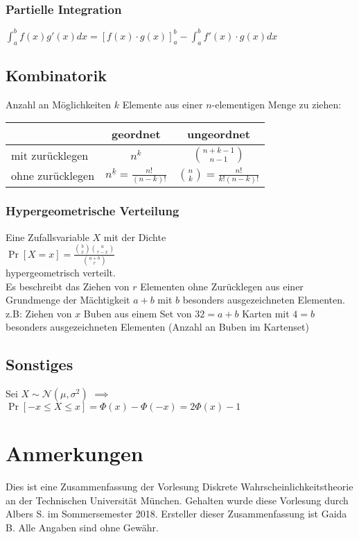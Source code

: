 \documentclass[a4paper,9pt]{extarticle}
\newcommand{\intab}[1] {\int_{a}^{b} #1 dx}
\begin{document}
\subsubsection*{Partielle Integration}
$\intab{f(x)g'(x)} = [f(x) ⋅ g(x)]_a^b - \intab{f'(x) ⋅ g(x)}$	


\subsection*{Kombinatorik}
Anzahl an Möglichkeiten $k$ Elemente aus einer $n$-elementigen Menge zu ziehen: \\
\begin{tabular}{|l|c|c|}
	\hline
	& geordnet & ungeordnet \\
	\hline
	mit zurücklegen & $n^k$ & $\binom{n + k - 1}{n - 1}$ \\
	\hline
	ohne zurücklegen & $n^{\underline{k}} = \frac{n!}{(n - k)!}$ & $\binom{n}{k} = \frac{n!}{k!(n - k)!}$ \\
	\hline
\end{tabular}

\subsubsection*{Hypergeometrische Verteilung}
Eine Zufallsvariable $X$ mit der Dichte \\
$\Pr[X = x] = \frac{\binom{b}{x} \binom{a}{r - x}}{\binom{a + b}{r}}$ \\
hypergeometrisch verteilt. \\
Es beschreibt das Ziehen von $r$ Elementen ohne Zurücklegen aus einer Grundmenge der Mächtigkeit $a + b$ mit $b$ besonders ausgezeichneten Elementen. \\
z.B: Ziehen von $x$ Buben aus einem Set von $32 = a + b$ Karten mit $4 = b$ besonders ausgezeichneten Elementen (Anzahl an Buben im Kartenset)

\subsection*{Sonstiges}
Sei $X \sim \mathcal{N}(\mu, \sigma^2)$ $\implies$ \\
$\Pr[-x ≤ X ≤ x] = \Phi(x) - \Phi(-x) = 2\Phi(x) -1$

\pagebreak
\section*{Anmerkungen}
Dies ist eine Zusammenfassung der Vorlesung Diskrete Wahrscheinlichkeitstheorie an der Technischen Universität München.
Gehalten wurde diese Vorlesung durch Albers S. im Sommersemester 2018.
Ersteller dieser Zusammenfassung ist Gaida B.
Alle Angaben sind ohne Gewähr.
\end{document}
